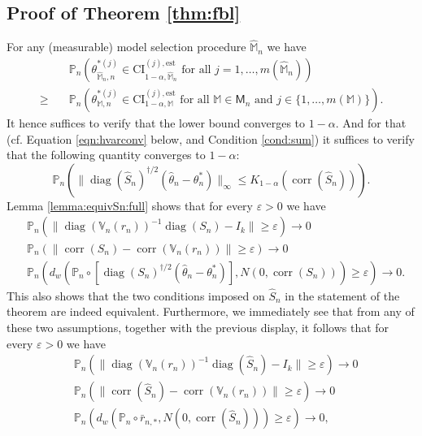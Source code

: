 \documentclass[preprint]{imsart}
\newcommand{\eps}{\varepsilon}
\DeclareMathOperator{\diag}{diag}
\DeclareMathOperator{\corr}{corr}
\numberwithin{equation}{section}
\begin{document}

\subsection{Proof of Theorem \ref{thm:fbl}}

For any (measurable) model selection procedure $\hat{\mathbb{M}}_n$ we have
%
\begin{align}
& \mathbb{P}_n\left( \theta^{*(j)}_{\hat{\mathbb{M}}_n, n} \in \mathrm{CI}_{1- \alpha, \hat{\mathbb{M}}_n}^{(j), \mathrm{est}} \text{ for all } j = 1, \hdots, m(\hat{\mathbb{M}}_n) \right) \\
\geq \quad &
\mathbb{P}_n \left(\theta^{*(j)}_{\mathbb{M}, n}   \in  \mathrm{CI}_{1-\alpha, \mathbb{M}}^{(j), \mathrm{est}} \text{ for all } \mathbb{M} \in \mathsf{M}_n \text{ and } j \in \{1, \hdots, m(\mathbb{M})\}  \right).
\end{align}
%
It hence suffices to verify that the lower bound converges to $1-\alpha$. And for that (cf. Equation \eqref{eqn:hvarconv} below, and Condition \ref{cond:sum}) it suffices to verify that the following quantity converges to $1-\alpha$:
%
\begin{equation}
\mathbb{P}_n \left( \| \diag(\hat{S}_n)^{\dagger/2} (\hat{\theta}_n - \theta^*_n) \|_{\infty} \leq K_{1-\alpha}(\corr(\hat{S}_n)) \right).
\end{equation}
%
Lemma \ref{lemma:equivSn:full} shows that for every $\eps > 0$ we have
%
\begin{align}\label{eqn:varconv}
&\mathbb{P}_n \left( \|\diag(\mathbb{V}_n(r_n))^{-1} \diag(S_n)  - I_k\| \geq \varepsilon \right) \to 0 \\
%
\label{eqn:corrconv}
&\mathbb{P}_n \left( \|\corr \left( S_n \right) - \corr \left(  \mathbb{V}_n(r_n) \right)\| \geq \varepsilon \right) \to 0 \\
%
\label{eqn:wconv}
&\mathbb{P}_n \left( d_w\left(\mathbb{P}_n \circ  \left[ \diag(S_n)^{\dagger/2} (\hat{\theta}_n - \theta^*_n) \right]  , N(0, \corr(S_n))\right) \geq \varepsilon\right) \to 0.
\end{align}
%
This also shows that the two conditions imposed  on $\hat{S}_n$ in the statement of the theorem are indeed equivalent. Furthermore, we immediately see that from any of these two assumptions, together with the previous display, it follows that for every $\eps > 0$ we have
%
\begin{align}\label{eqn:hvarconv}
&\mathbb{P}_n \left( \|\diag(\mathbb{V}_n(r_n))^{-1} \diag(\hat{S}_n)  - I_k\| \geq \varepsilon \right) \to 0 \\
%
\label{eqn:hcorrconv}
&\mathbb{P}_n \left( \|\corr \left( \hat{S}_n \right) - \corr \left(  \mathbb{V}_n(r_n) \right)\| \geq \varepsilon \right) \to 0 \\
%
\label{eqn:hwconv}
&\mathbb{P}_n \left( d_w\left(\mathbb{P}_n \circ  \bar{r}_{n, *}  , N(0, \corr(\hat{S}_n))\right) \geq \varepsilon\right) \to 0,
\end{align}
\end{document}
